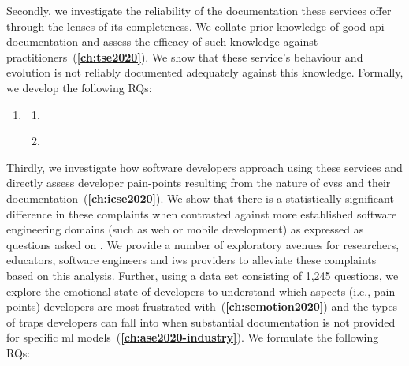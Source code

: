 Secondly, we investigate the reliability of the documentation these services offer through the lenses of its completeness. We collate prior knowledge of good \gls{api} documentation and assess the efficacy of such knowledge against practitioners~(\textbf{\cref{ch:tse2020}}). We show that these service's behaviour and evolution is not reliably documented adequately against this knowledge. Formally, we develop the following RQs:

\begin{leftbar}
\begin{enumerate}[label=\faQuestionCircle~~\textbf{RQ\arabic*.}, ref=RQ\arabic*, leftmargin=2.5\parindent, rightmargin=1\parindent,start=2]
    \item \textbf{\RQTwoTextDocumentation{}}\label{rq:docs}
    \begin{enumerate}[label=\textit{RQ2.\arabic*.}, ref=RQ2.\arabic*]
      \item \RQTwoTextDocumentationWhatIsCompleteDocs{} \label{rq:docs:complete}
      \item \RQTwoTextDocumentationMissingAttributes{} \label{rq:docs:missing}
    \end{enumerate}
\end{enumerate}
\end{leftbar}

Thirdly, we investigate how software developers approach using these services and directly assess developer pain-points resulting from the nature of \glspl{cvs} and their documentation~(\textbf{\cref{ch:icse2020}}). We show that there is a statistically significant difference in these complaints when contrasted against more established software engineering domains (such as web or mobile development) as expressed as questions asked on . We provide a number of exploratory avenues for researchers, educators, software engineers and \gls{iws} providers to alleviate these complaints based on this analysis. Further, using a data set consisting of 1,245  questions, we explore the emotional state of developers to understand which aspects (i.e., pain-points) developers are most frustrated with~(\textbf{\cref{ch:semotion2020}}) and the types of traps developers can fall into when substantial documentation is not provided for specific \gls{ml} models~(\textbf{\cref{ch:ase2020-industry}}). We formulate the following RQs:

